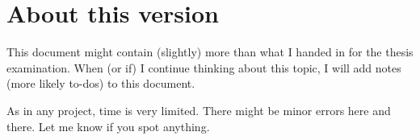\documentclass[
	twoside=false, %
]{kaobook}
\begin{document}
\chapter*{About this version}

This document might contain (slightly) more than what I handed in for the thesis examination. 
When (or if) I continue thinking about this topic, I will add notes (more likely to-dos) to this document.

As in any project, time is very limited. There might be minor errors here and there. Let me know if you spot anything.




\begingroup %

\setlength{\textheight}{230\vscale} %

\etocstandarddisplaystyle %
\etocstandardlines %

\tableofcontents %


\let\cleardoublepage\bigskip
\let\clearpage\bigskip


\endgroup


\mainmatter %

\renewcommand{\marginlayout}{%
 \newgeometry{
	top=27.4mm,
	bottom=27.4mm,
	inner=24.8mm,
	textwidth=127mm, %
	marginparsep=5.2mm,
	marginparwidth=39.4mm 
 }%
}
\end{document}

